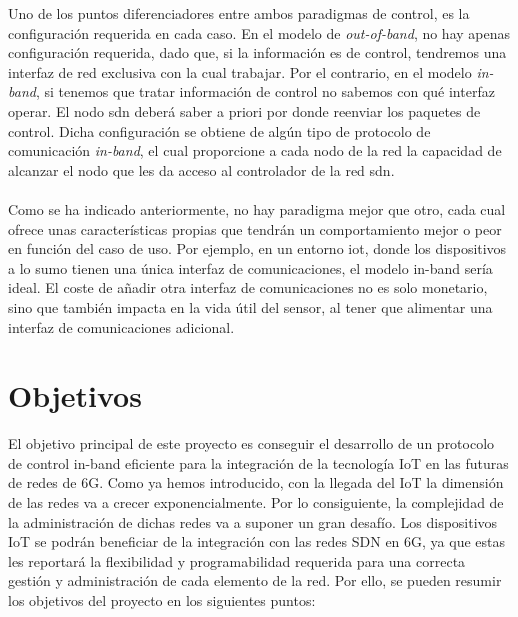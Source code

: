 Uno de los puntos diferenciadores entre ambos paradigmas de control, es la configuración requerida en cada caso. En el modelo de \textit{out-of-band}, no hay apenas configuración requerida, dado que, si la información es de control, tendremos una interfaz de red exclusiva con la cual trabajar. Por el contrario, en el modelo \textit{in-band}, si tenemos que tratar información de control no sabemos con qué interfaz operar. El nodo \gls{sdn} deberá saber a priori por donde reenviar los paquetes de control. Dicha configuración se obtiene de algún tipo de protocolo de comunicación \textit{in-band}, el cual proporcione a cada nodo de la red la capacidad de alcanzar el nodo que les da acceso al controlador de la red \gls{sdn}.\\
\\
Como se ha indicado anteriormente, no hay paradigma mejor que otro, cada cual ofrece unas características propias que tendrán un comportamiento mejor o peor en función del caso de uso. Por ejemplo, en un entorno \gls{iot}, donde los dispositivos a lo sumo tienen una única interfaz de comunicaciones, el modelo in-band sería ideal. El coste de añadir otra interfaz de comunicaciones no es solo monetario, sino que también impacta en la vida útil del sensor, al tener que alimentar una interfaz de comunicaciones adicional.


\section{Objetivos}
\label{sec:obj}

El objetivo principal de este proyecto es conseguir el desarrollo de un protocolo de control in-band eficiente para la integración de la tecnología IoT en las futuras de redes de 6G. Como ya hemos introducido, con la llegada del IoT la dimensión de las redes va a crecer exponencialmente. Por lo consiguiente, la complejidad de la administración de dichas redes va a suponer un gran desafío. Los dispositivos IoT se podrán beneficiar de la integración con las redes SDN en 6G, ya que estas les reportará la flexibilidad y programabilidad requerida para una correcta gestión y administración de cada elemento de la red. Por ello, se pueden resumir los objetivos del proyecto en los siguientes puntos:

